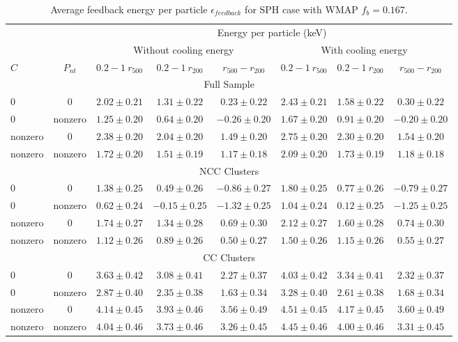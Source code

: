 \documentclass[a4paper,fleqn,usenatbib]{mnras}
\begin{document}
\begin{table*}
 \caption{Average feedback energy per particle $\epsilon_{feedback}$ for SPH case with WMAP $f_{b}=0.167$.}
 \begin{tabular}{@{}lccccccc}
  \hline
 &&\multicolumn{6}{c}{Energy per particle (keV) }\\
    \cline{3-8}
&&\multicolumn{3}{c}{Without cooling energy}&\multicolumn{3}{c}{With cooling energy}\\
\cline{3-8}
 $C$    &$P_{nt}$   & $0.2-1~r_{500}$ &   $0.2-1~r_{200}$& $r_{500}-r_{200}$&   $0.2-1~r_{500}$&$0.2-1~r_{200}$&$r_{500}-r_{200}$\\
  \hline
\multicolumn{8}{c}{Full Sample}\\
\hline
 0        &0          &$2.02\pm0.21$     &$1.31\pm0.22$   & $0.23\pm0.22$  &$2.43\pm0.21$     &$1.58\pm0.22$  & $0.30\pm0.22$\\
 0        & nonzero   & $1.25\pm0.20$   &$0.64\pm0.20$    & $-0.26\pm0.20$& $1.67\pm0.20$      &$0.91\pm0.20$  &  $-0.20\pm0.20$       \\
nonzero   & 0         &$ 2.38\pm0.20$    &$2.04\pm0.20$    & $1.49\pm0.20$&$ 2.75\pm0.20$       &$2.30\pm0.20$ & $  1.54\pm0.20$ \\
nonzero   & nonzero   & $1.72\pm0.20$   &$1.51\pm0.19$    & $1.17\pm0.18$ &$2.09\pm0.20$      &$1.73\pm0.19$  &$1.18\pm0.18$   \\
  \hline
\multicolumn{8}{c}{NCC Clusters}\\
\hline
 0        &0          &$1.38\pm0.25$    & $0.49\pm0.26$   &$-0.86\pm0.27$& $1.80\pm0.25$&$0.77\pm0.26$ &   $-0.79\pm0.27$ \\
 0        & nonzero   &$ 0.62\pm0.24$   &$-0.15\pm0.25$    & $-1.32\pm0.25$& $1.04\pm0.24$     &$0.12\pm0.25$   & $-1.25\pm0.25$ \\
nonzero   & 0         &$1.74\pm0.27$    &$1.34\pm 0.28$    & $0.69\pm0.30$&$2.12\pm0.27$       &$1.60\pm0.28$ & $0.74\pm0.30$ \\
nonzero   & nonzero   &$1.12\pm0.26$   &$0.89\pm0.26$     & $0.50\pm0.27$&$1.50\pm0.26$      &$1.15\pm0.26$  & $ 0.55\pm0.27$       \\
  \hline 
\multicolumn{8}{c}{CC Clusters}\\
\hline
 0       &0          &$ 3.63\pm0.42$    &$3.08\pm0.41$   &$2.27\pm0.37$ & $4.03\pm0.42$      &$3.34\pm0.41$ &  $2.32\pm0.37$        \\
 0       & nonzero   & $2.87\pm0.40$   &$2.35\pm0.38$    &$1.63\pm0.34$ & $3.28\pm0.40$     &$2.61\pm0.38$   &  $1.68\pm0.34$    \\
nonzero  & 0         &$ 4.14\pm0.45$    &$3.93\pm0.46$   & $3.56\pm0.49$ &$4.51\pm0.45$       &$ 4.17\pm0.45$ &  $3.60\pm0.49$    \\
nonzero  & nonzero   & $4.04\pm0.46$   &$3.73\pm0.46$    &$3.26\pm0.45$  &$4.45\pm0.46$      &$4.00\pm0.46$  &   $3.31\pm0.45$    \\
  \hline 
 \end{tabular}
 \label{sphwmap}
\end{table*}
\end{document}

